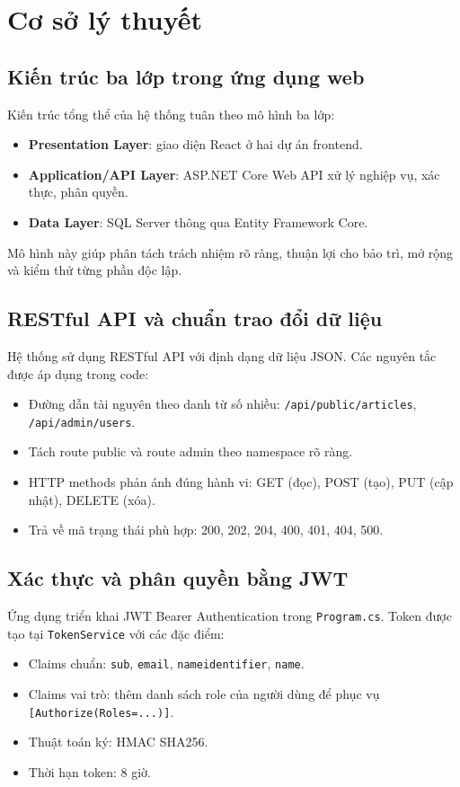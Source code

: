 \documentclass[12pt,a4paper]{article}
\begin{document}
\newpage

\section{Cơ sở lý thuyết}

\subsection{Kiến trúc ba lớp trong ứng dụng web}
Kiến trúc tổng thể của hệ thống tuân theo mô hình ba lớp:
\begin{itemize}[leftmargin=1.1cm]
  \item \textbf{Presentation Layer}: giao diện React ở hai dự án frontend.
  \item \textbf{Application/API Layer}: ASP.NET Core Web API xử lý nghiệp vụ, xác thực, phân quyền.
  \item \textbf{Data Layer}: SQL Server thông qua Entity Framework Core.
\end{itemize}

Mô hình này giúp phân tách trách nhiệm rõ ràng, thuận lợi cho bảo trì, mở rộng và kiểm thử từng phần độc lập.

\subsection{RESTful API và chuẩn trao đổi dữ liệu}
Hệ thống sử dụng RESTful API với định dạng dữ liệu JSON. Các nguyên tắc được áp dụng trong code:
\begin{itemize}[leftmargin=1.1cm]
  \item Đường dẫn tài nguyên theo danh từ số nhiều: \texttt{/api/public/articles}, \texttt{/api/admin/users}.
  \item Tách route public và route admin theo namespace rõ ràng.
  \item HTTP methods phản ánh đúng hành vi: GET (đọc), POST (tạo), PUT (cập nhật), DELETE (xóa).
  \item Trả về mã trạng thái phù hợp: 200, 202, 204, 400, 401, 404, 500.
\end{itemize}

\subsection{Xác thực và phân quyền bằng JWT}
Ứng dụng triển khai JWT Bearer Authentication trong \texttt{Program.cs}. Token được tạo tại \texttt{TokenService} với các đặc điểm:
\begin{itemize}[leftmargin=1.1cm]
  \item Claims chuẩn: \texttt{sub}, \texttt{email}, \texttt{nameidentifier}, \texttt{name}.
  \item Claims vai trò: thêm danh sách role của người dùng để phục vụ \texttt{[Authorize(Roles=...)]}.
  \item Thuật toán ký: HMAC SHA256.
  \item Thời hạn token: 8 giờ.
\end{itemize}
\end{document}
